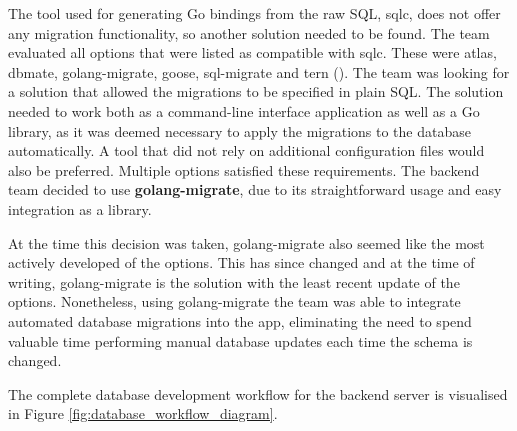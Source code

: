 The tool used for generating Go bindings from the raw SQL, sqlc, does not offer
any migration functionality, so another solution needed to be found. The team
evaluated all options that were listed as compatible with sqlc. These were
atlas, dbmate, golang-migrate, goose, sql-migrate and tern
(\cite{sqlc_updating_database_schema}). The team was looking for a solution that
allowed the migrations to be specified in plain SQL. The solution needed to work
both as a command-line interface application as well as a Go library, as it was
deemed necessary to apply the migrations to the database automatically. A tool
that did not rely on additional configuration files would also be preferred.
Multiple options satisfied these requirements. The backend team decided to use
\textbf{golang-migrate}, due to its straightforward usage and easy integration as a
library.

At the time this decision was taken, golang-migrate also seemed like
the most actively developed of the options. This has since changed and at the
time of writing, golang-migrate is the solution with the least recent update of
the options. Nonetheless, using golang-migrate the team was able to integrate automated
database migrations into the app, eliminating the need to spend valuable time
performing manual database updates each time the schema is changed.

The complete database development workflow for the backend server is visualised
in Figure \ref{fig:database_workflow_diagram}.

